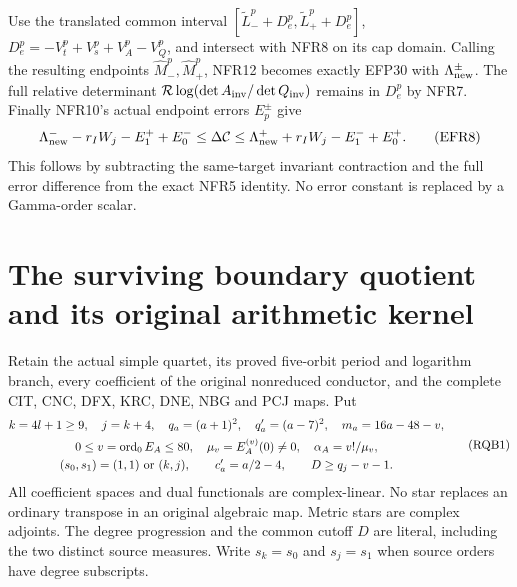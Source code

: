 \documentclass[11pt,a4paper]{article}
\begin{document}
Use the translated common interval
$[\widetilde L_-^p+D_e^p,\widetilde L_+^p+D_e^p]$,
$D_e^p=-V_t^p+V_s^p+V_A^p-V_Q^p$, and intersect with NFR8 on
its cap domain. Calling the resulting endpoints
$\widehat M_-^p,\widehat M_+^p$, NFR12 becomes exactly EFP30
with $\Lambda_{\rm new}^\pm$. The full relative determinant
$\mathcal R\log(\det A_{\rm inv}/\det Q_{\rm inv})$ remains in
$D_e^p$ by NFR7.
Finally NFR10's actual endpoint errors $E_p^\pm$ give
\[
\Lambda_{\rm new}^- -r_IW_j-E_1^++E_0^-
 \le\Delta\mathcal C\le
 \Lambda_{\rm new}^+ +r_IW_j-E_1^-+E_0^+ .
\tag{EFR8}
\]
This follows by subtracting the same-target invariant contraction
and the full error difference from the exact NFR5 identity.
No error constant is replaced by a Gamma-order scalar.







\endgroup


\clearpage
\clearpage
\begingroup
\providecommand{\im}{\operatorname{im}}
\providecommand{\rank}{\operatorname{rank}}
\section{The surviving boundary quotient and its original arithmetic kernel}
\label{sec:RQB}

Retain the actual simple quartet, its proved five-orbit period and logarithm
branch, every coefficient of the original nonreduced conductor, and the
complete CIT, CNC, DFX, KRC, DNE, NBG and PCJ maps. Put
\[
\begin{gathered}
 k=4l+1\ge9,\quad j=k+4,\quad q_a=(a+1)^2,\quad q'_a=(a-7)^2,
 \quad m_a=16a-48-v,\\
 0\le v=\operatorname{ord}_0E_A\le80,\quad
 \mu_v=E_A^{(v)}(0)\ne0,\quad \alpha_A=v!/\mu_v,\\
 (s_0,s_1)=(1,1)\ \hbox{or}\ (k,j),\qquad
 c'_a=a/2-4,\qquad D\ge q_j-v-1 .
\end{gathered}\tag{RQB1}
\]
All coefficient spaces and dual functionals are complex-linear. No star
replaces an ordinary transpose in an original algebraic map. Metric stars
are complex adjoints. The degree progression and the common cutoff $D$
are literal, including the two distinct source measures. Write
$s_k=s_0$ and $s_j=s_1$ when source orders have degree subscripts.
\end{document}
